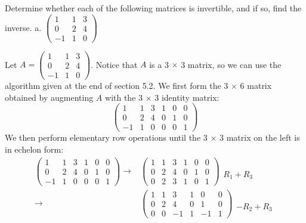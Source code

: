 \documentclass[12pt]{article}
\newenvironment{problem}[2][Problem]
{
	\begin{trivlist} 
		\item[\hskip \labelsep {\bfseries #1 #2:}]
	}
{
	\end{trivlist}
	}
\newenvironment{solution}[1][Solution]
{
	\begin{trivlist} 
		\item[\hskip \labelsep {\itshape #1:}]
	}
	{
	\end{trivlist}
}
\begin{document}
\newpage
\begin{problem}{3}
Determine whether each of the following matrices is invertible, and if so, find the inverse.
\noindent
\newline
a. $\begin{pmatrix} 1&1&3\\0&2&4\\-1&1&0 \end{pmatrix}$
\begin{solution}
Let $A=\begin{pmatrix} 1&1&3\\0&2&4\\-1&1&0 \end{pmatrix}$. Notice that $A$ is a 3 $\times$ 3 matrix, so we can use the algorithm given at the end of section 5.2. We first form the 3 $\times$ 6 matrix obtained by augmenting $A$ with the 3 $\times$ 3 identity matrix:
\[
\begin{pmatrix} 1&1&3&1&0&0\\0&2&4&0&1&0\\-1&1&0&0&0&1 \end{pmatrix}
\]
We then perform elementary row operations until the 3 $\times$ 3 matrix on the left is in echelon form:
\begin{align*}
\begin{pmatrix} 1&1&3&1&0&0\\0&2&4&0&1&0\\-1&1&0&0&0&1 \end{pmatrix} \rightarrow & \begin{pmatrix} 1&1&3&1&0&0\\0&2&4&0&1&0\\0&2&3&1&0&1 \end{pmatrix} \begin{matrix}  \text{} \\ \text{} \\ R_1 + R_3 \text{} \end{matrix} \\
%
\rightarrow & \begin{pmatrix} 1&1&3&1&0&0\\0&2&4&0&1&0\\0&0&-1&1&-1&1 \end{pmatrix}\begin{matrix} \text{} \\ \text{} \\ -R_2+R_3\text{} \end{matrix} \\
\end{align*}

\end{solution}
\end{problem}
\end{document}
